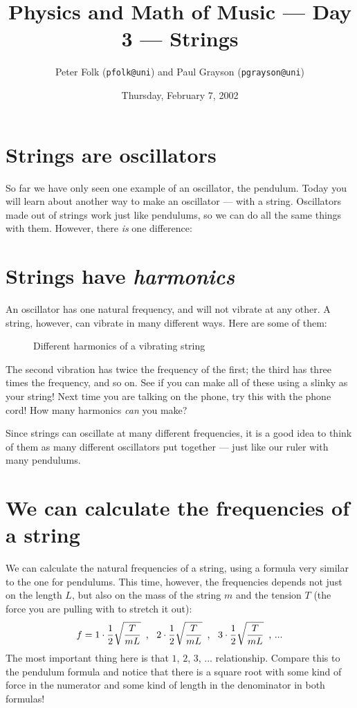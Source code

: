 \documentclass{article}
\begin{document}
\title{Physics and Math of Music --- Day 3 --- Strings}
\date{Thursday, February 7, 2002}
\author{Peter Folk ({\tt pfolk@uni}) and Paul Grayson ({\tt pgrayson@uni})}
\maketitle

\section*{Strings are oscillators}
So far we have only seen one example of an oscillator, the pendulum.
Today you will learn about another way to make an oscillator --- with
a string.  Oscillators made out of strings work just like pendulums,
so we can do all the same things with them.  However, there {\sl is\/}
one difference:

\section*{Strings have {\it harmonics}}
An oscillator has one natural frequency, and will not vibrate at any
other.  A string, however, can vibrate in many different ways.  Here
are some of them:
\begin{figure}[h]
\begin{center}
	
	\caption{Different harmonics of a vibrating string}
\end{center}
\end{figure}
The second vibration has twice the frequency of the first; the third
has three times the frequency, and so on.  See if you can make all of
these using a slinky as your string!  Next time you are talking on the
phone, try this with the phone cord!  How many harmonics {\sl can\/}
you make?

Since strings can oscillate at many different frequencies, it is a
good idea to think of them as many different oscillators put together
--- just like our ruler with many pendulums.

\section*{We can calculate the frequencies of a string}
We can calculate the natural frequencies of a string, using a
formula very similar to the one for pendulums.  This time, however, the
frequencies depends not just on the length $L$, but also on the mass
of the string $m$ and the tension $T$ (the force you are pulling with
to stretch it out):
$$ f = 
 1\cdot{1 \over 2} \sqrt{T \over m L}\,\,\,\hbox{, }\,\,\,
 2\cdot{1 \over 2} \sqrt{T \over m L}\,\,\,\hbox{, }\,\,\,
 3\cdot{1 \over 2} \sqrt{T \over m L}\,\,\,\hbox{, ...}
$$
The most important thing here is that $1$, $2$, $3$, ... relationship.
Compare this to the pendulum formula and notice that there is a square
root with some kind of force in the numerator and some kind of length
in the denominator in both formulas!
\end{document}
